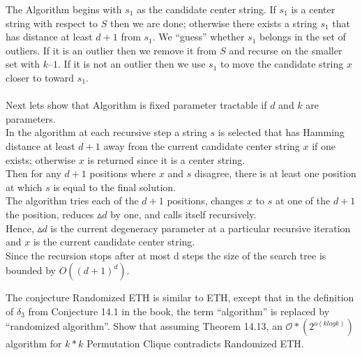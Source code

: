 \documentclass[11pt]{exam}
\begin{document}
\begin{questions}
\begin{solution}
    The Algorithm begins with $s_1$ as the candidate center string. If $s_1$ is a center string with respect to $S$ then we are done; otherwise there exists a string $s_1$ that has distance at least $d + 1$ from $s_1$. We “guess” whether $s_1$ belongs in the set of outliers. If it is an outlier then we remove it from $S$ and recurse on the smaller set with $k – 1$. If it is not an outlier then we use $s_1$ to move the candidate string $x$ closer to toward $s_1$.\\\\
    Next lets show that Algorithm is fixed parameter tractable if $d$ and $k$ are parameters.\\
    In the algorithm at each recursive step a string $s$ is selected that has Hamming distance at least $d + 1$ away from the current candidate center string $x$ if one exists; otherwise $x$ is returned since it is a center string.\\
    Then for any $d + 1$ positions where $x$ and $s$ disagree, there is at least one position at which $s$ is equal to the final solution.\\
    The algorithm tries each of the $d + 1$ positions, changes $x$ to $s$ at one of the $d + 1$ the position, reduces $\vartriangle d$ by one, and calls itself recursively.\\
    Hence, $\vartriangle d$ is the current degeneracy parameter at a particular recursive iteration and $x$ is the current candidate center string.\\
    Since the recursion stops after at most d steps the size of the search tree is bounded by $O((d + 1)^d)$.

    
\end{solution}

\question The conjecture Randomized ETH is similar to ETH, except that in the definition of $\delta_3$ from Conjecture 14.1 in the book, the term “algorithm” is replaced by “randomized algorithm”.  Show that assuming Theorem 14.13, an $\mathcal{O} * (2^{o(k log k)} )$ algorithm for $k * k$ Permutation Clique contradicts Randomized ETH.


\end{questions}
\end{document}
